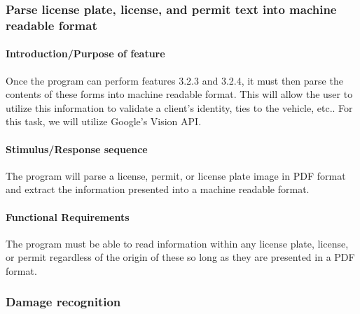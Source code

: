 \documentclass[onecolumn, draftclsnofoot,10pt, compsoc]{IEEEtran}
\begin{document}
\subsubsection{Parse license plate, license, and permit text into machine readable format}\vspace{.5cm}

\hfill\begin{minipage}{\dimexpr\textwidth-1cm}
\paragraph{Introduction/Purpose of feature}
Once the program can perform features 3.2.3 and 3.2.4, it must then parse the contents of these forms into machine readable format. This will allow the user to utilize this information to validate a client’s identity, ties to the vehicle, etc.. For this task, we will utilize Google’s Vision API.
\paragraph{Stimulus/Response sequence}
The program will parse a license, permit, or license plate image in PDF format and extract the information presented into a machine readable format. 
\paragraph{Functional Requirements}
The program must be able to read information within any license plate, license, or permit regardless of the origin of these so long as they are presented in a PDF format.  
\end{minipage}
\vspace{.75cm}

\subsubsection{Damage recognition}\vspace{.5cm}
\end{document}
